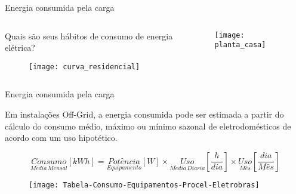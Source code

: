 \begin{frame}{Energia consumida pela carga}

\begin{columns}[T]
    \begin{column}{0.5\textwidth}
		\vspace{1cm}
		Quais são seus hábitos de consumo de energia elétrica?
	    \vspace{.5cm}
    	\begin{figure}[H]
			\texttt{[image: curva\_residencial]}
		\end{figure}
    \end{column}
    \begin{column}{0.5\textwidth} 
		\begin{figure}[H]
			\texttt{[image: planta\_casa]}
		\end{figure}  		
    \end{column}
\end{columns}


\end{frame}

\begin{frame}{Energia consumida pela carga}

Em instalações Off-Grid, a energia consumida pode ser estimada a partir do cálculo do consumo médio, máximo ou mínimo sazonal de eletrodomésticos de acordo com um uso hipotético. 

\begin{equation*}
\underset{M\acute{e}dia \, Mensal}{Consumo}\left [ kWh \right ]=\underset{Equipamento}{Pot\hat{e}ncia}\left [ W \right ]\times\underset{M\acute{e}dia \, Diaria}{Uso}\left [ \frac{h}{dia} \right ]\times\underset{M\hat{e}s}{Uso}\left [  \frac{dia}{M\hat{e}s} \right ]
\end{equation*}

\begin{figure}[H]
	\texttt{[image: Tabela-Consumo-Equipamentos-Procel-Eletrobras]}
\end{figure}



\end{frame}


